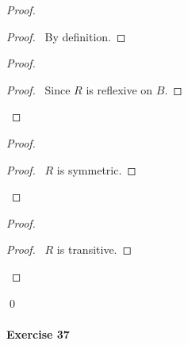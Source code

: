 \documentclass{report}
\begin{document}
    \begin{proof}
        \pf
        \begin{proof}
            \pf\ By definition.
        \end{proof}
        \begin{proof}
            \begin{proof}
                \pf\ Since $R$ is reflexive on $B$.
            \end{proof}
        \end{proof}
        \begin{proof}
            \begin{proof}
                \pf\ $R$ is symmetric.
            \end{proof}
        \end{proof}
        \begin{proof}
            \begin{proof}
                \pf\ $R$ is transitive.
            \end{proof}
        \end{proof}
        \qed
    \end{proof}

    \paragraph{Exercise 37}
\end{document}
